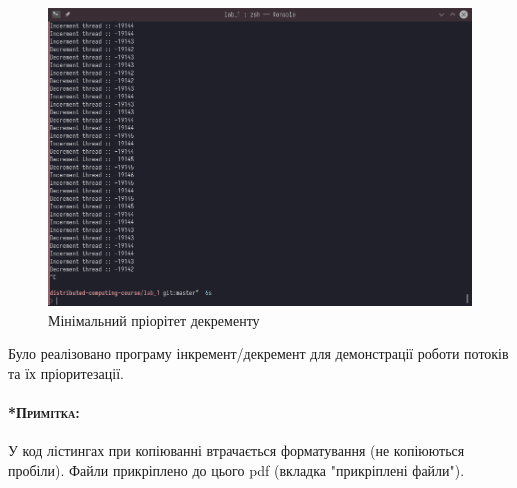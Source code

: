 \documentclass{udstu}
\begin{document}
\begin{figure}[!htp]
	\centering
	\includegraphics[scale=0.5]{PNG/min-prior-decrement.png}
	\caption{Мінімальний пріорітет декременту}
	\label{fig:figure1}
\end{figure}

\conclusions

Було реалізовано програму інкремент/декремент для демонстрації роботи потоків та їх пріоритезації.


\paragraph{\textsc{*Примітка:}}
У код лістингах при копіюванні втрачається форматування (не копіюються пробіли).
Файли прикріплено до цього pdf (вкладка "прикріплені файли").

\inputminted{rust}{../src/main.rs}
\end{document}
